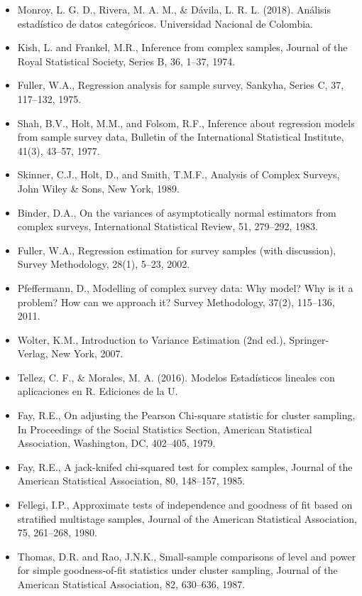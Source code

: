 \documentclass[
  12pt,
]{book}
\begin{document}
\begin{itemize}
\item
  Monroy, L. G. D., Rivera, M. A. M., \& Dávila, L. R. L. (2018). Análisis estadístico de datos categóricos. Universidad Nacional de Colombia.
\item
  Kish, L. and Frankel, M.R., Inference from complex samples, Journal of the Royal Statistical Society, Series B, 36, 1--37, 1974.
\item
  Fuller, W.A., Regression analysis for sample survey, Sankyha, Series C, 37, 117--132, 1975.
\item
  Shah, B.V., Holt, M.M., and Folsom, R.F., Inference about regression models from sample survey data, Bulletin of the International Statistical Institute, 41(3), 43--57, 1977.
\item
  Skinner, C.J., Holt, D., and Smith, T.M.F., Analysis of Complex Surveys, John Wiley \& Sons, New York, 1989.
\item
  Binder, D.A., On the variances of asymptotically normal estimators from complex surveys, International Statistical Review, 51, 279--292, 1983.
\item
  Fuller, W.A., Regression estimation for survey samples (with discussion), Survey Methodology, 28(1), 5--23, 2002.
\item
  Pfeffermann, D., Modelling of complex survey data: Why model? Why is it a problem? How can we approach it? Survey Methodology, 37(2), 115--136, 2011.
\item
  Wolter, K.M., Introduction to Variance Estimation (2nd ed.), Springer-Verlag, New York, 2007.
\item
  Tellez, C. F., \& Morales, M. A. (2016). Modelos Estadísticos lineales con aplicaciones en R. Ediciones de la U.
\item
  Fay, R.E., On adjusting the Pearson Chi-square statistic for cluster sampling, In Proceedings of the Social Statistics Section, American Statistical Association, Washington, DC, 402--405, 1979.
\item
  Fay, R.E., A jack-knifed chi-squared test for complex samples, Journal of the American Statistical Association, 80, 148--157, 1985.
\item
  Fellegi, I.P., Approximate tests of independence and goodness of fit based on stratified multistage samples, Journal of the American Statistical Association, 75, 261--268, 1980.
\item
  Thomas, D.R. and Rao, J.N.K., Small-sample comparisons of level and power for simple goodness-of-fit statistics under cluster sampling, Journal of the American Statistical Association, 82, 630--636, 1987.

\end{itemize}
\end{document}
